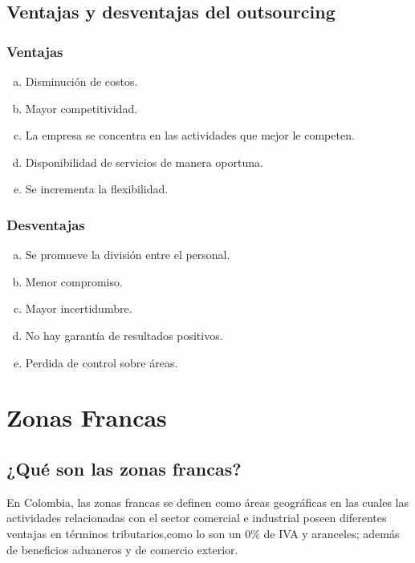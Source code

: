 \documentclass[10pt]{article}
\begin{document}
    \subsection{Ventajas y desventajas del outsourcing}

    \subsubsection{Ventajas}
    \begin{enumerate}[a)]
        
        \item Disminución de costos.
        \item Mayor competitividad.
        \item La empresa se concentra en las actividades que mejor le competen.
        \item Disponibilidad de servicios de manera oportuna.
        \item Se incrementa la flexibilidad.

    \end{enumerate} 
        
    \subsubsection{Desventajas}
    \begin{enumerate}[a)]

        \item Se promueve la división entre el personal.
        \item Menor compromiso.
        \item Mayor incertidumbre.
        \item No hay garantía de resultados positivos.
        \item Perdida de control sobre áreas.
        
    \end{enumerate} 

\section{Zonas Francas}
    
    \subsection{¿Qué son las zonas francas?}
    En Colombia, las zonas francas se definen como áreas geográficas en las cuales las actividades relacionadas con el sector comercial e industrial poseen diferentes ventajas en términos tributarios,como lo son un 0\% de IVA y aranceles; además de beneficios aduaneros y de comercio exterior. \cite{ref:zonaBogota}
    
\end{document}
